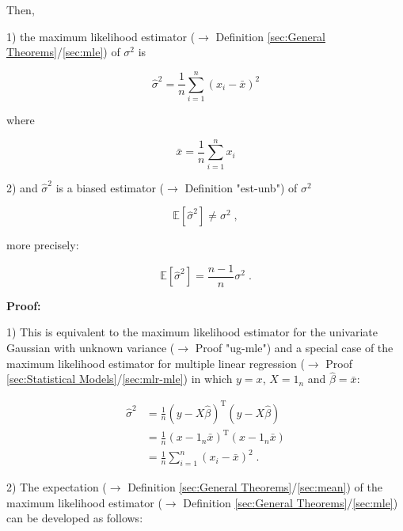 \documentclass[a4paper,12pt,twoside]{book}
\begin{document}
Then,

1) the maximum likelihood estimator ($\rightarrow$ Definition \ref{sec:General Theorems}/\ref{sec:mle}) of $\sigma^2$ is

\begin{equation} \label{eq:resvar-bias-resvar-mle}
\hat{\sigma}^2 = \frac{1}{n} \sum_{i=1}^{n} \left( x_i - \bar{x} \right)^2
\end{equation}

where

\begin{equation} \label{eq:resvar-bias-mean-mle}
\bar{x} = \frac{1}{n} \sum_{i=1}^{n} x_i
\end{equation}

2) and $\hat{\sigma}^2$ is a biased estimator ($\rightarrow$ Definition "est-unb") of $\sigma^2$

\begin{equation} \label{eq:resvar-bias-resvar-var}
\mathbb{E}\left[ \hat{\sigma}^2 \right] \neq \sigma^2 \; ,
\end{equation}

more precisely:

\begin{equation} \label{eq:resvar-bias-resvar-bias}
\mathbb{E}\left[ \hat{\sigma}^2 \right] = \frac{n-1}{n} \sigma^2 \; .
\end{equation}


\vspace{1em}
\textbf{Proof:}

1) This is equivalent to the maximum likelihood estimator for the univariate Gaussian with unknown variance ($\rightarrow$ Proof "ug-mle") and a special case of the maximum likelihood estimator for multiple linear regression ($\rightarrow$ Proof \ref{sec:Statistical Models}/\ref{sec:mlr-mle}) in which $y = x$, $X = 1_n$ and $\hat{\beta} = \bar{x}$:

\begin{equation} \label{eq:resvar-bias-resvar-mle-qed}
\begin{split}
\hat{\sigma}^2 &= \frac{1}{n} (y-X\hat{\beta})^\mathrm{T} (y-X\hat{\beta}) \\
&= \frac{1}{n} (x - 1_n \bar{x})^\mathrm{T} (x - 1_n \bar{x}) \\
&= \frac{1}{n} \sum_{i=1}^{n} \left( x_i - \bar{x} \right)^2 \; .
\end{split}
\end{equation}

2) The expectation ($\rightarrow$ Definition \ref{sec:General Theorems}/\ref{sec:mean}) of the maximum likelihood estimator ($\rightarrow$ Definition \ref{sec:General Theorems}/\ref{sec:mle}) can be developed as follows:
\end{document}
